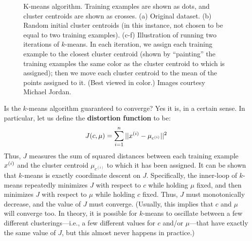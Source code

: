 \documentclass{article}
\begin{document}
\begin{figure}
\begin{subfigure}[b]{0.3\textwidth}
    \caption{}
    \label{}
  \end{subfigure}
  \caption{K-means algorithm. Training examples are shown as dots, and cluster
  centroids are shown as crosses.  (a) Original dataset. (b) Random initial cluster
  centroids (in this instance, not chosen to be equal to two training examples). (c-f) Illustration of running
  two iterations of $k$-means.  In each iteration, we assign each training example 
  to the closest cluster centroid (shown by ``painting'' the training examples 
  the same color as the cluster centroid to which is assigned); then we move
  each cluster centroid to the mean of the points assigned to it.  (Best viewed in color.) 
  Images courtesy Michael Jordan.}
  \label{}
\end{figure}





Is the $k$-means algorithm guaranteed to converge?  Yes it is, in a certain sense.
In particular, let us define the {\bf distortion function} to be: 
\[
J(c, \mu) = \sum_{i=1}^{n} ||x^{(i)} - \mu_{c^{(i)}}||^2
\]
Thus, $J$ measures the sum of squared distances between each training example ${x^{(i)}}$
and the cluster centroid $\mu_{c^{(i)}}$ to which it has been assigned.  It can
be shown that $k$-means is exactly coordinate descent on $J$.  Specifically, the inner-loop
of $k$-means repeatedly minimizes $J$ with respect to $c$ while holding $\mu$ fixed, and then
minimizes $J$ with respect to $\mu$ while holding $c$ fixed.
Thus, $J$ must
monotonically decrease, and the value of $J$ must converge.  (Usually, this implies
that $c$ and $\mu$ will converge too.  In theory, it is possible
for $k$-means to oscillate between a few different clusterings---i.e., a few different
values for $c$ and/or $\mu$---that have exactly
the same value of $J$, but this almost never happens in practice.)
\end{document}
